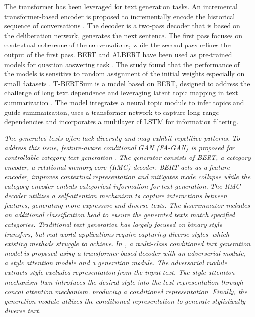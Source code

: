 \documentclass[preprint,12pt]{elsarticle}
\begin{document}
The transformer has been leveraged for text generation tasks. An incremental transformer-based encoder is proposed to incrementally encode the historical sequence of conversations \citep{li_incremental_2019}. The decoder is a two-pass decoder that is based on the deliberation network, generates the next sentence. The first pass focuses on contextual coherence of the conversations, while the second pass refines the output of the first pass. BERT and ALBERT have been used as pre-trained models for question answering task \citep{alrowili_biom-transformers_2021}. The study found that the performance of the models is sensitive to random assignment of the initial weights especially on small datasets \citep{alrowili_exploring_2022}. T-BERTSum is a model based on BERT, designed to address the challenge of long text dependence and leveraging latent topic mapping in text summarization \citep{ma_t-bertsum_2021}. The model integrates a neural topic module to infer topics and guide summarization, uses a transformer network to capture long-range dependencies and incorporates a multilayer of LSTM for information filtering. 

\emph{The generated texts often lack diversity and may exhibit repetitive patterns. To address this issue, feature-aware conditional GAN (FA-GAN) is proposed for controllable category text generation \citep{li_feature-aware_2023}. The generator consists of BERT, a category encoder, a relational memory core (RMC) decoder. BERT acts as a feature encoder, improves contextual representation and mitigates mode collapse while the category encoder embeds categorical information for text generation. The RMC decoder utilizes a self-attention mechanism to capture interactions between features, generating more expressive and diverse texts. The discriminator includes an additional classification head to ensure the generated texts match specified categories. Traditional text generation has largely focused on binary style transfers, but real-world applications require capturing diverse styles, which existing methods struggle to achieve. In \citep{kwon_class_2024}, a multi-class conditioned text generation model is proposed using a transformer-based decoder with an adversarial module, a style attention module and a generation module. The adversarial module extracts style-excluded representation from the input text. The style attention mechanism then introduces the desired style into the text representation through concat attention mechanism, producing a conditioned representation. Finally, the generation module utilizes the conditioned representation to generate stylistically diverse text. }
\end{document}
